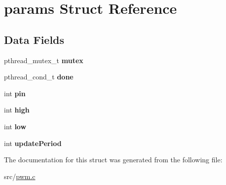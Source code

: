 \hypertarget{structparams}{}\section{params Struct Reference}
\label{structparams}
\subsection*{Data Fields}
\begin{DoxyCompactItemize}
\item 
\hypertarget{structparams_ac589238c2b606f5d6afa544be9fda051}{}\label{structparams_ac589238c2b606f5d6afa544be9fda051} 
pthread\+\_\+mutex\+\_\+t {\bfseries mutex}
\item 
\hypertarget{structparams_a294842dca6c16c9018023971eb2e98d6}{}\label{structparams_a294842dca6c16c9018023971eb2e98d6} 
pthread\+\_\+cond\+\_\+t {\bfseries done}
\item 
\hypertarget{structparams_aee56142f044f0d53195cc351f96e6ff8}{}\label{structparams_aee56142f044f0d53195cc351f96e6ff8} 
int {\bfseries pin}
\item 
\hypertarget{structparams_a68432dcb603dff164a376082e9a4a4f5}{}\label{structparams_a68432dcb603dff164a376082e9a4a4f5} 
int {\bfseries high}
\item 
\hypertarget{structparams_abad5125f8a2c8fdb5578dc5d35753c4e}{}\label{structparams_abad5125f8a2c8fdb5578dc5d35753c4e} 
int {\bfseries low}
\item 
\hypertarget{structparams_accbc4f0653c9aab09878917c0a29ee03}{}\label{structparams_accbc4f0653c9aab09878917c0a29ee03} 
int {\bfseries update\+Period}
\end{DoxyCompactItemize}


The documentation for this struct was generated from the following file\+:\begin{DoxyCompactItemize}
\item 
src/\hyperlink{pwm_8c}{pwm.\+c}\end{DoxyCompactItemize}
